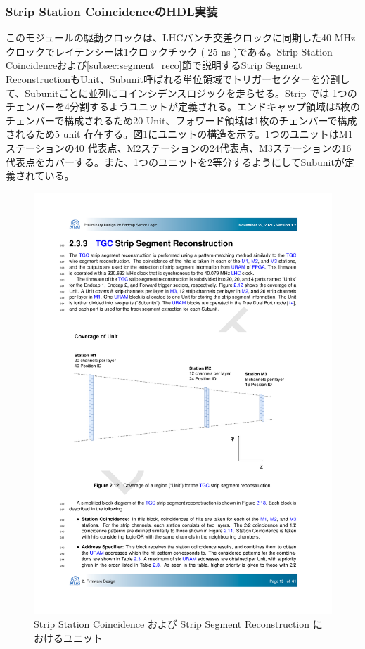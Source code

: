 \subsubsection*{Strip Station CoincidenceのHDL実装}
このモジュールの駆動クロックは、LHCバンチ交差クロックに同期した40 MHzクロックでレイテンシーは1クロックチック ( 25 ns )である。Strip Station Coincidenceおよび\ref{subsec:segment_reco}節で説明するStrip Segment ReconstructionもUnit、Subunit呼ばれる単位領域でトリガーセクターを分割して、Subunitごとに並列にコインシデンスロジックを走らせる。Strip では 1つのチェンバーを4分割するようユニットが定義される。エンドキャップ領域は5枚のチェンバーで構成されるため20 Unit、フォワード領域は1枚のチェンバーで構成されるため5 unit 存在する。図\ref{StationCoin_unit_strip}にユニットの構造を示す。1つのユニットはM1ステーションの40 代表点、M2ステーションの24代表点、M3ステーションの16代表点をカバーする。また、1つのユニットを2等分するようにしてSubunitが定義されている。

\begin{figure} 
    \centering
    \includegraphics[width=16cm]{fig/SL/StationCoin_unit_strip.pdf}
    \caption[Strip Station Coincidence および Strip Segment Reconstruction におけるユニット]{Strip Station Coincidence および Strip Segment Reconstruction におけるユニット}
    \label{StationCoin_unit_strip}
\end{figure}

